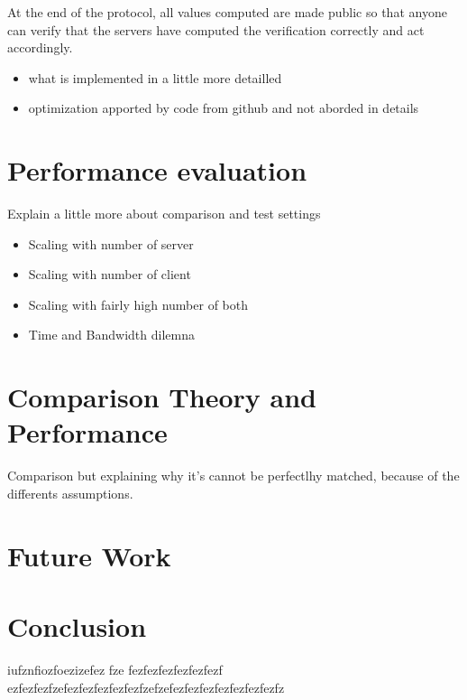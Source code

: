 \documentclass{article}
\begin{document}
At the end of the protocol, all values computed are made public so that anyone can verify that the servers have computed the verification correctly and act accordingly.
\begin{itemize}

\item what is implemented in a little more detailled
\item optimization apported by code from github and not aborded in details

\end{itemize}


\section{Performance evaluation}

Explain a little more about comparison and test settings


\begin{itemize}


\item Scaling with number of server
\item Scaling with number of client
\item Scaling with fairly high number of both 
\item Time and Bandwidth dilemna

\end{itemize}


\section{Comparison Theory and Performance}
Comparison but explaining why it's cannot be perfectlhy matched, because of the differents assumptions.

\section{Future Work}

\newpage
\section*{Conclusion}
iufznfiozfoezizefez fze
fezfezfezfezfezfezf
ezfezfezfzefezfezfezfezfezfzefzefezfezfezfezfezfezfezfz
\end{document}

